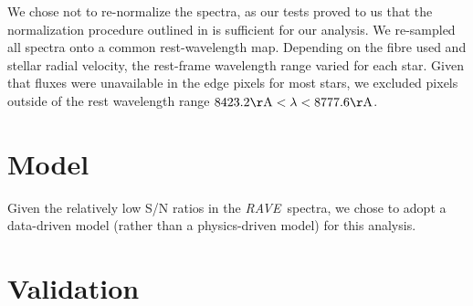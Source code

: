 \documentclass[preprint2,trackchanges]{aastex}
\newcommand{\project}[1]{\textsl{#1}}
\newcommand{\acronym}[1]{{\small{#1}}}
\newcommand{\rave}{\project{\acronym{RAVE}}}
\begin{document}
We chose not to re-normalize the spectra, as our tests proved to us that the
normalization procedure outlined in \citet{Kunder_2016} is sufficient for our
analysis.  We re-sampled all spectra onto a common rest-wavelength map.
Depending on the fibre used and stellar radial velocity, the rest-frame wavelength
range varied for each star.  Given that fluxes were unavailable in the edge
pixels for most stars, we excluded pixels outside of the rest wavelength range
$8423.2{\rm \AA} < \lambda < 8777.6{\rm \AA}$.


\section{Model}
\label{sec:model}

Given the relatively low S/N ratios in the \rave\ spectra, we chose to adopt a 
data-driven model (rather than a physics-driven model) for this analysis.








\section{Validation}
\label{sec:validation}





\end{document}
